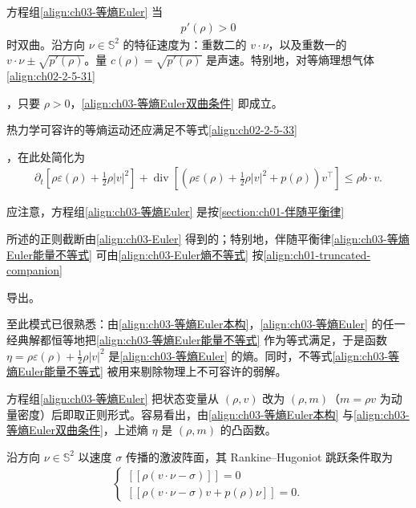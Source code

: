 ﻿\documentclass[../../main.tex]{subfiles}
\begin{document}
方程组\eqref{align:ch03-等熵Euler} 当
\begin{align}
p'(\rho)>0
\label{align:ch03-等熵Euler双曲条件}
\end{align}
时双曲。沿方向 $\nu\in\mathbb{S}^{2}$ 的特征速度为：重数二的 $v\cdot\nu$，以及重数一的 $v\cdot\nu\pm\sqrt{p'(\rho)}$。量 $c(\rho)=\sqrt{p'(\rho)}$ 是声速。特别地，对等熵理想气体\eqref{align:ch02-2-5-31}%

，只要 $\rho>0$，\eqref{align:ch03-等熵Euler双曲条件} 即成立。

热力学可容许的等熵运动还应满足不等式\eqref{align:ch02-2-5-33}%

，在此处简化为
\begin{align}
\partial_{t}\left[\rho\varepsilon(\rho)+\frac{1}{2}\rho|v|^{2}\right]+\operatorname{div}\left[\left(\rho\varepsilon(\rho)+\frac{1}{2}\rho|v|^{2}+p(\rho)\right)v^{\top}\right]\leqslant\rho b\cdot v.
\label{align:ch03-等熵Euler能量不等式}
\end{align}

应注意，方程组\eqref{align:ch03-等熵Euler} 是按\cref{section:ch01-伴随平衡律}%

所述的正则截断由\eqref{align:ch03-Euler} 得到的；特别地，伴随平衡律\eqref{align:ch03-等熵Euler能量不等式} 可由\eqref{align:ch03-Euler熵不等式} 按\eqref{align:ch01-truncated-companion}%

导出。

至此模式已很熟悉：由\eqref{align:ch03-等熵Euler本构}，\eqref{align:ch03-等熵Euler} 的任一经典解都恒等地把\eqref{align:ch03-等熵Euler能量不等式} 作为等式满足，于是函数 $\eta=\rho\varepsilon(\rho)+\frac{1}{2}\rho|v|^{2}$ 是\eqref{align:ch03-等熵Euler} 的熵。同时，不等式\eqref{align:ch03-等熵Euler能量不等式} 被用来剔除物理上不可容许的弱解。

方程组\eqref{align:ch03-等熵Euler} 把状态变量从 $(\rho,v)$ 改为 $(\rho,m)$（$m=\rho v$ 为动量密度）后即取正则形式。容易看出，由\eqref{align:ch03-等熵Euler本构} 与\eqref{align:ch03-等熵Euler双曲条件}，上述熵 $\eta$ 是 $(\rho,m)$ 的凸函数。

沿方向 $\nu\in\mathbb{S}^{2}$ 以速度 $\sigma$ 传播的激波阵面，其 Rankine--Hugoniot 跳跃条件取为
\begin{align}
\begin{cases}
[\![\rho(v\cdot\nu-\sigma)]\!]=0\\
[\![\rho(v\cdot\nu-\sigma)v+p(\rho)\nu]\!]=0.
\end{cases}
\label{align:ch03-等熵Euler-RH}
\end{align}
\end{document}

